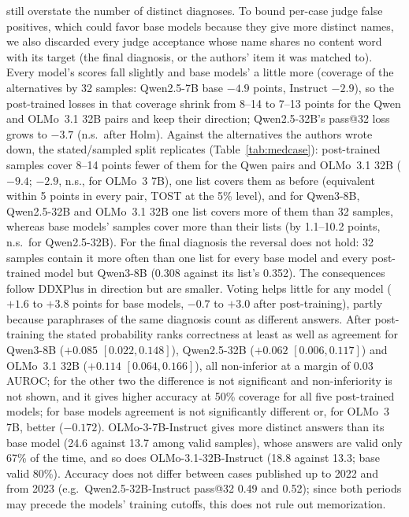 \documentclass[11pt]{article}
\begin{document}
still overstate the number of distinct diagnoses. To bound per-case judge false positives, which could favor base models because they give more distinct names, we also discarded every judge acceptance whose name shares no content word with its target (the final diagnosis, or the authors' item it was matched to). Every model's scores fall slightly and base models' a little more (coverage of the alternatives by 32 samples: Qwen2.5-7B base $-4.9$ points, Instruct $-2.9$), so the post-trained losses in that coverage shrink from 8--14 to 7--13 points for the Qwen and OLMo~3.1 32B pairs and keep their direction; Qwen2.5-32B's pass@32 loss grows to $-3.7$ (n.s.\ after Holm).
Against the alternatives the authors wrote down, the stated/sampled split replicates (Table~\ref{tab:medcase}): post-trained samples cover 8--14 points fewer of them for the Qwen pairs and OLMo~3.1 32B ($-9.4$; $-2.9$, n.s., for OLMo~3 7B), one list covers them as before (equivalent within 5 points in every pair, TOST at the 5\% level), and for Qwen3-8B, Qwen2.5-32B and OLMo~3.1 32B one list covers more of them than 32 samples, whereas base models' samples cover more than their lists (by 1.1--10.2 points, n.s.\ for Qwen2.5-32B). For the final diagnosis the reversal does not hold: 32 samples contain it more often than one list for every base model and every post-trained model but Qwen3-8B (0.308 against its list's 0.352). The consequences follow DDXPlus in direction but are smaller. Voting helps little for any model ($+1.6$ to $+3.8$ points for base models, $-0.7$ to $+3.0$ after post-training), partly because paraphrases of the same diagnosis count as different answers. After post-training the stated probability ranks correctness at least as well as agreement for Qwen3-8B ($+0.085$ $[0.022,0.148]$), Qwen2.5-32B ($+0.062$ $[0.006,0.117]$) and OLMo~3.1 32B ($+0.114$ $[0.064,0.166]$), all non-inferior at a margin of 0.03 AUROC; for the other two the difference is not significant and non-inferiority is not shown, and it gives higher accuracy at 50\% coverage for all five post-trained models; for base models agreement is not significantly different or, for OLMo~3 7B, better ($-0.172$). OLMo-3-7B-Instruct gives more distinct answers than its base model (24.6 against 13.7 among valid samples), whose answers are valid only 67\% of the time, and so does OLMo-3.1-32B-Instruct (18.8 against 13.3; base valid 80\%). Accuracy does not differ between cases published up to 2022 and from 2023 (e.g.\ Qwen2.5-32B-Instruct pass@32 0.49 and 0.52); since both periods may precede the models' training cutoffs, this does not rule out memorization.
\end{document}
